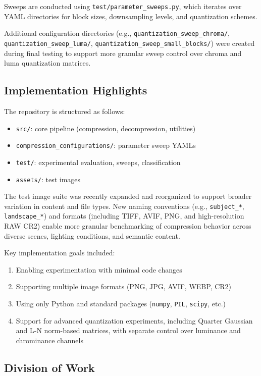 Sweeps are conducted using \texttt{test/parameter\_sweeps.py}, which iterates over YAML directories for block sizes, downsampling levels, and quantization schemes.

Additional configuration directories (e.g., \texttt{quantization\_sweep\_chroma/}, \texttt{quantization\_sweep\_luma/}, \texttt{quantization\_sweep\_small\_blocks/}) were created during final testing to support more granular sweep control over chroma and luma quantization matrices.

\subsection{Implementation Highlights}

The repository is structured as follows:
\begin{itemize}
    \item \texttt{src/}: core pipeline (compression, decompression, utilities)
    \item \texttt{compression\_configurations/}: parameter sweep YAMLs
    \item \texttt{test/}: experimental evaluation, sweeps, classification
    \item \texttt{assets/}: test images
\end{itemize}

The test image suite was recently expanded and reorganized to support broader variation in content and file types. New naming conventions (e.g., \texttt{subject\_*}, \texttt{landscape\_*}) and formats (including TIFF, AVIF, PNG, and high-resolution RAW CR2) enable more granular benchmarking of compression behavior across diverse scenes, lighting conditions, and semantic content.

Key implementation goals included:
\begin{enumerate}
    \item Enabling experimentation with minimal code changes
    \item Supporting multiple image formats (PNG, JPG, AVIF, WEBP, CR2)
    \item Using only Python and standard packages (\texttt{numpy}, \texttt{PIL}, \texttt{scipy}, etc.)
    \item Support for advanced quantization experiments, including Quarter Gaussian and L-N norm-based matrices, with separate control over luminance and chrominance channels
\end{enumerate}

\subsection{Division of Work}
\label{sec:division-of-work}

